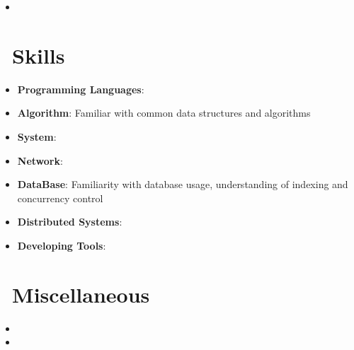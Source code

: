 \documentclass{resume}
\newcommand{\en}[1]{#1}
\newcommand{\zh}[1]{}
\begin{document}
\en{}
\zh{C 语言 Json 解析库}
\begin{itemize}
      \item \en{}
            \zh{实现符合标准的 JSON 解析器和生成器，支持 Unicode，学习了 TDD 开发、Valgrind 内存泄漏工具的使用}
\end{itemize}

\section{\faCogs\ \en{Skills}\zh{技能}}

\begin{itemize}[parsep=0.5ex]
      \item \en{\textbf{Programming Languages}: }
            \zh{\textbf{编程语言}: 熟悉 C++/Go 基础，了解部分 C11/C14 特性，了解 Python}

      \item \en{\textbf{Algorithm}: Familiar with common data structures and algorithms}
            \zh{\textbf{数据结构与算法}: 熟悉常用数据结构与算法}

      \item \en{\textbf{System}: }
            \zh{\textbf{系统}: 进程相关包括通信、同步、调度；了解死锁以及虚拟内存等；熟悉 Socket 编程，进程间通讯编程；熟悉 Linux I/O 模型，了解多路复用机制，了解容器化技术}

      \item \en{\textbf{Network}: }
            \zh{\textbf{网络}：熟悉 OSI 模型，了解常见网络协议（TCP，UDP，HTTP），了解 HTTP 2.0}

      \item \en{\textbf{DataBase}: Familiarity with database usage, understanding of indexing and concurrency control}
            \zh{\textbf{数据库}: 熟悉 MySQL 数据库使用，了解 NoSQL，了解 Key-Value 存储原理}

      \item \en{\textbf{Distributed Systems}: }
            \zh{\textbf{分布式系统}: 了解 CAP 理论，了解 Raft 算法，一致性哈希}%

      \item \en{\textbf{Developing Tools}: }
            \zh{\textbf{开发工具}: 熟悉 Linux，了解 Git，Docker 等}
\end{itemize}

\section{\faInfo\ \en{Miscellaneous}\zh{杂项}}
\begin{itemize}[parsep=0.5ex]
      \item \en{}
            \zh{兴趣：分布式系统、云、存储、缓存、数据库等}
      \item \en{}
            \zh{开源爱好者，喜欢折腾（日常使用 ArchLinux，Emacs），热爱编程，喜欢记录以及分享技术，写博客}

\end{itemize}
\end{document}
